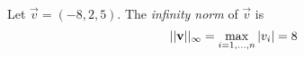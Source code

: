 \begin{example}
    Let $\vec{v} = (-8, 2, 5)$. The \textit{infinity norm} of $\vec{v}$ is
    $$ ||\mathbf{v}||_{\infty} = \max_{i = 1, \hdots, n}{|v_i|} = 8 $$
\end{example}